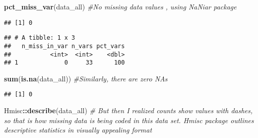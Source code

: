 \documentclass[]{article}
\newenvironment{Shaded}{\begin{snugshade}}{\end{snugshade}}
\newcommand{\KeywordTok}[1]{\textcolor[rgb]{0.13,0.29,0.53}{\textbf{#1}}}
\newcommand{\StringTok}[1]{\textcolor[rgb]{0.31,0.60,0.02}{#1}}
\newcommand{\CommentTok}[1]{\textcolor[rgb]{0.56,0.35,0.01}{\textit{#1}}}
\newcommand{\OperatorTok}[1]{\textcolor[rgb]{0.81,0.36,0.00}{\textbf{#1}}}
\newcommand{\NormalTok}[1]{#1}
\begin{document}
\begin{Shaded}
\begin{Highlighting}[]
\KeywordTok{pct_miss_var}\NormalTok{(data_all) }\CommentTok{#No missing data values , using NaNiar package}
\end{Highlighting}
\end{Shaded}

\begin{verbatim}
## [1] 0
\end{verbatim}

\begin{Shaded}
\end{Shaded}

\begin{verbatim}
## # A tibble: 1 x 3
##   n_miss_in_var n_vars pct_vars
##           <int>  <int>    <dbl>
## 1             0     33      100
\end{verbatim}

\begin{Shaded}
\begin{Highlighting}[]
\KeywordTok{sum}\NormalTok{(}\KeywordTok{is.na}\NormalTok{(data_all)) }\CommentTok{#Similarly, there are zero NAs}
\end{Highlighting}
\end{Shaded}

\begin{verbatim}
## [1] 0
\end{verbatim}

\begin{Shaded}
\begin{Highlighting}[]
\NormalTok{Hmisc}\OperatorTok{::}\KeywordTok{describe}\NormalTok{(data_all) }\CommentTok{# But then I realized counts show values with dashes, so that is how missing data is being coded in this data set. Hmisc package outlines descriptive statistics in visually appealing format}
\end{Highlighting}
\end{Shaded}
\end{document}
